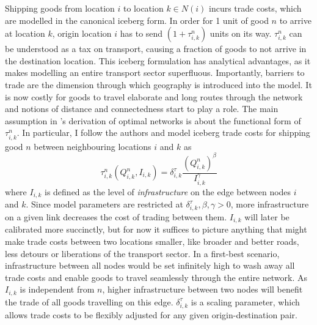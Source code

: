 \documentclass[11pt, oneside]{article}   	%
\begin{document}
Shipping goods from location $i$ to location $k \in N(i)$ incurs trade costs, which are modelled in the canonical iceberg form. In order for 1 unit of good $n$ to arrive at location $k$, origin location $i$ has to send $(1+\tau_{i,k}^{n})$ units on its way. $\tau_{i,k}^{n}$ can be understood as a tax on transport, causing a fraction of goods to not arrive in the destination location. This iceberg formulation has analytical advantages, as it makes modelling an entire transport sector superfluous. Importantly, barriers to trade are the dimension through which geography is introduced into the model. It is now costly for goods to travel elaborate and long routes through the network and notions of distance and connectedness start to play a role. The main assumption in \citeauthor{fajgelbaum_optimal_2017}'s derivation of optimal networks is about the functional form of $\tau_{i,k}^{n}$. In particular, I follow the authors and model iceberg trade costs for shipping good $n$ between neighbouring locations $i$ and $k$ as
\begin{equation}
  \tau_{i,k}^{n}(Q_{i,k}^{n}, I_{i,k}) = \delta^{\tau}_{i,k} \frac{(Q_{i,k}^{n})^{\beta}}{I_{i,k}^{\gamma}}
  \label{eq:tau}
\end{equation}
where $I_{i,k}$ is defined as the level of \emph{infrastructure} on the edge between nodes $i$ and $k$. Since model parameters are restricted at $\delta^{\tau}_{i,k}, \beta, \gamma >0$, more infrastructure on a given link decreases the cost of trading between them. $I_{i,k}$ will later be calibrated more succinctly, but for now it suffices to picture anything that might make trade costs between two locations smaller, like broader and better roads, less detours or liberations of the transport sector. In a first-best scenario, infrastructure between all nodes would be set infinitely high to wash away all trade costs and enable goods to travel seamlessly through the entire network. As $I_{i,k}$ is independent from $n$, higher infrastructure between two nodes will benefit the trade of all goods travelling on this edge. $\delta^{\tau}_{i,k}$ is a scaling parameter, which allows trade costs to be flexibly adjusted for any given origin-destination pair.
\end{document}
